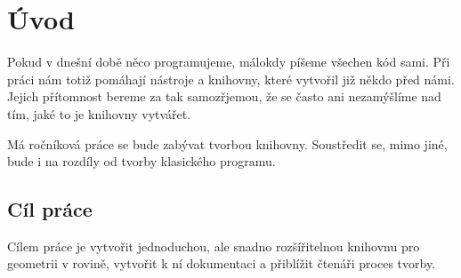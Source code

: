 \chapter{Úvod}
Pokud v dnešní době něco programujeme, málokdy píšeme všechen kód sami. 
Při práci nám totiž pomáhají nástroje a knihovny, které vytvořil již někdo před námi.
Jejich přítomnost bereme za tak samozřjemou, že se často ani nezamýšlíme nad tím, jaké to je knihovny vytvářet.  

Má ročníková práce se bude zabývat tvorbou knihovny. Soustředit se, mimo jiné, bude i na rozdíly od tvorby klasického programu.

\section{Cíl práce}

Cílem práce je vytvořit jednoduchou, ale snadno rozšířitelnou knihovnu pro geometrii v rovině, vytvořit k ní dokumentaci a přiblížit čtenáři proces tvorby. 